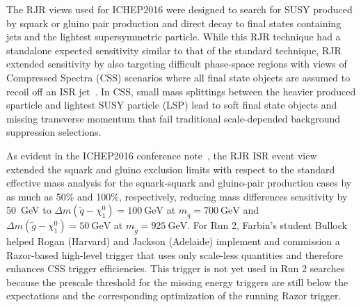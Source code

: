The RJR views used for ICHEP2016 were designed to search for SUSY
produced by squark or gluino pair production and direct decay to final
states containing jets and the lightest supersymmetric particle. While
this RJR technique had a standalone expected sensitivity similar to
that of the standard technique, RJR extended sensitivity by also
targeting difficult phase-space regions with views of Compressed
Spectra (CSS) scenarios where all final state objects are assumed to
recoil off an ISR jet~\cite{Jackson:2016mfb}. In CSS, small mass
splittings between the heavier produced sparticle and lightest SUSY
particle (LSP) lead to soft final state objects and missing transverse
momentum that fail traditional scale-depended background suppression
selections.

As evident in the ICHEP2016 conference note~\cite{}, the RJR ISR event
view extended the squark and gluino exclusion limits with respect to
the standard effective mass analysis for the squark-squark and
gluino-pair production cases by as much as 50\% and 100\%,
respectively, reducing mass differences sensitivity by 50~GeV to
$\Delta m(\tilde{q} -
\chi_1^0) = 100~\mathrm{GeV}$ at $m_{\tilde{q}} = 700~\mathrm{GeV}$  and 
$\Delta m(\tilde{g} -\chi_1^0) = 50~\mathrm{GeV}$ at $m_{\tilde{g}} =
925~\mathrm{GeV}$. For Run 2, Farbin's student Bullock helped Rogan
(Harvard) and Jackson (Adelaide) implement and commission a
Razor-based high-level trigger that uses only scale-less quantities
and therefore enhances CSS trigger efficiencies. This trigger is not
yet used in Run 2 searches because the prescale threshold for the
missing energy triggers are still below the expectations and the
corresponding optimization of the running Razor trigger.



